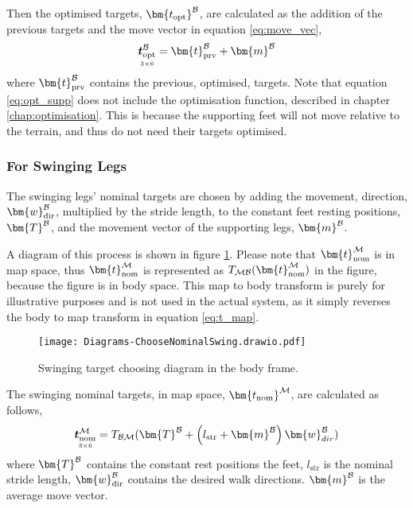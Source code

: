                 Then the optimised targets, \(\bm{t_\text{opt}} ^\fbody\), are calculated as the addition of the previous targets and the move vector in equation \ref{eq:move_vec},
                \begin{equation} \label{eq:opt_supp}
                    \mdim{\boldsymbol{t}_\text{opt}^\fbody}{3}{6} = \bm{t}_\text{prv}^\fbody + \bm{m}^\fbody
                \end{equation}
                where \(\bm{t}_\text{prv}^\fbody\) contains the previous, optimised, targets. Note that equation \ref{eq:opt_supp} does not include the optimisation
                function, described in chapter \ref{chap:optimisation}. This is because the supporting feet will not move relative to the terrain, and thus do not need their targets optimised.
            
            \newpage
            \subsubsection{For Swinging Legs} \label{sec:swing}
                The swinging legs' nominal targets are chosen by adding the movement, direction, \(\bm{w}_\text{dir}^\fbody\), multiplied by the stride length, to the constant feet resting positions, \(\bm{T}^\fbody\), and the movement vector of the supporting legs, \(\bm{m} ^\fbody\).
                
                A diagram of this process is shown in figure \ref{fig:swinging_targ}. Please note that \(\bm{t}_\text{nom}^{\fmap}\) is in map space, thus \(\bm{t}_\text{nom}^{\fmap}\) is represented as \(\transframe{\bm{t}_\text{nom}^{\fmap}}{\fmap}{\fbody}\) in the figure, because the figure is in body space. This map to body transform is purely for illustrative purposes and is not used in the actual system, as it simply reverses the body to map transform in equation \ref{eq:t_map}.
                \begin{figure}[h]
                    \centering
                    \texttt{[image: Diagrams-ChooseNominalSwing.drawio.pdf]}
                    \caption{Swinging target choosing diagram in the body frame.} 
                    \label{fig:swinging_targ}
                \end{figure}

                \noindent
                The swinging nominal targets, in map space, \(\bm{t_\text{nom}} ^{\fmap}\), are calculated as follows,
                \begin{equation} \label{eq:t_map}
                    \mdim{\boldsymbol{t}_\text{nom}^{\fmap}}{3}{6} = \transframe{\bm{T}^\fbody + \left(l_\text{str}+\bm{m}^\fbody\right)\bm{w}_{dir}^\fbody}{\fbody}{\fmap}
                \end{equation}
                where \(\bm{T}^\fbody\) contains the constant rest positions the feet, \(l_\text{str}\) is the nominal stride length, \(\bm{w}_\text{dir}^\fbody\) contains the desired walk directions. \(\bm{m}^\fbody\) is the average move vector.

